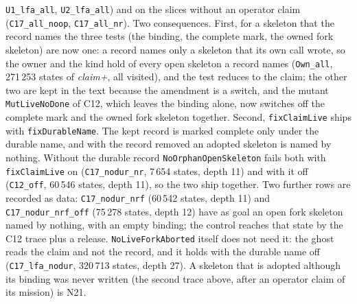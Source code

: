 \documentclass[a4paper,10pt,fleqn]{article}
\newcommand{\field}[1]{\texttt{#1}}
\begin{document}
\begin{enumerate}
    \texttt{U1\_lfa\_all}, \texttt{U2\_lfa\_all}) and on the slices without an
    operator claim (\texttt{C17\_all\_noop}, \texttt{C17\_all\_nr}). Two
    consequences. First, for a skeleton that the record names the three tests
    (the binding, the complete mark, the owned fork skeleton) are now one: a
    record names only a skeleton that its own call wrote, so the owner and the
    kind hold of every open skeleton a record names (\texttt{Own\_all},
    271\,253 states of \emph{claim+}, all visited), and the test reduces to the
    claim; the other two are kept in the text because the amendment is a
    switch, and the mutant \texttt{MutLiveNoDone} of C12, which leaves the
    binding alone, now switches off the complete mark and the owned fork
    skeleton together. Second, \field{fixClaimLive} ships with
    \field{fixDurableName}. The kept record is marked complete only under the
    durable name, and with the record removed an adopted skeleton is named by
    nothing. Without the durable record \field{NoOrphanOpenSkeleton} fails
    both with \field{fixClaimLive} on (\texttt{C17\_nodur\_nr}, 7\,654 states,
    depth 11) and with it off (\texttt{C12\_off}, 60\,546 states, depth 11),
    so the two ship together. Two further rows are recorded as data:
    \texttt{C17\_nodur\_nrf} (60\,542 states, depth 11) and
    \texttt{C17\_nodur\_nrf\_off} (75\,278 states, depth 12) have as goal an
    open fork skeleton named by nothing, with an empty binding; the control
    reaches that state by the C12 trace plus a release. \field{NoLiveForkAborted} itself does not need
    it: the ghost reads the claim and not the record, and it holds with the
    durable name off (\texttt{C17\_lfa\_nodur}, 320\,713 states, depth 27). A skeleton that is adopted although its binding was never
    written (the second trace above, after an operator claim of its mission) is
    N21.
\end{enumerate}
\end{document}
